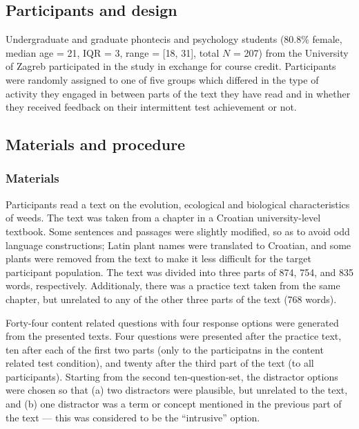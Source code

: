 \documentclass[11pt,]{article}
\title{}
\author{}
\date{}
\begin{document}
\hypertarget{participants-and-design}{%
\subsection{Participants and design}\label{participants-and-design}}

Undergraduate and graduate phontecis and psychology students (80.8\%
female, median age = 21, IQR = 3, range = {[}18, 31{]}, total \(N\) =
207) from the University of Zagreb participated in the study in exchange
for course credit. Participants were randomly assigned to one of five
groups which differed in the type of activity they engaged in between
parts of the text they have read and in whether they received feedback
on their intermittent test achievement or not.

\hypertarget{materials-and-procedure}{%
\subsection{Materials and procedure}\label{materials-and-procedure}}

\hypertarget{materials}{%
\subsubsection{Materials}\label{materials}}

Participants read a text on the evolution, ecological and biological
characteristics of weeds. The text was taken from a chapter in a
Croatian university-level textbook. Some sentences and passages were
slightly modified, so as to avoid odd language constructions; Latin
plant names were translated to Croatian, and some plants were removed
from the text to make it less difficult for the target participant
population. The text was divided into three parts of 874, 754, and 835
words, respectively. Additionaly, there was a practice text taken from
the same chapter, but unrelated to any of the other three parts of the
text (768 words).

Forty-four content related questions with four response options were
generated from the presented texts. Four questions were presented after
the practice text, ten after each of the first two parts (only to the
participatns in the content related test condition), and twenty after
the third part of the text (to all participants). Starting from the
second ten-question-set, the distractor options were chosen so that (a)
two distractors were plausible, but unrelated to the text, and (b) one
distractor was a term or concept mentioned in the previous part of the
text --- this was considered to be the ``intrusive'' option.
\end{document}

